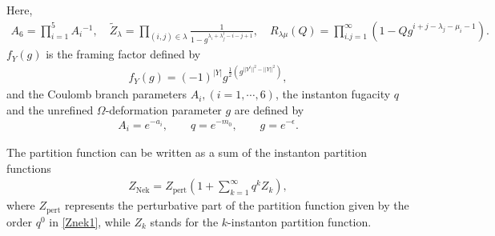 \documentclass[11pt,a4paper]{article}
\begin{document}
Here, 
\begin{align}
A_6 
= \prod_{i=1}^5 A_i{}^{-1}, 
\quad
\tilde{Z}_{\lambda} 
= \prod_{(i,j) \in \lambda} \frac{1}{1 - g^{\lambda_i + \lambda^t_j - i - j +1} } , 
\quad
R_{\lambda \mu } (Q)= \prod_{i.j=1}^{\infty} (1 - Q g^{i+j-\lambda_j - \mu_i -1}).
\end{align}
$f_{Y}(g)$ is the framing factor defined by
\begin{align}
f_Y(g) = (-1)^{|Y|}g^{\frac{1}{2}(g^{||Y^t||^2 - ||Y||^2})},
\end{align}
and the Coulomb branch parameters $A_i, (i=1, \cdots, 6)$, the instanton fugacity $q$ and the unrefined $\Omega$-deformation parameter $g$ are defined by 
\begin{align}
A_i = e^{-a_i}, \qquad q = e^{-m_0}, \qquad g=e^{-\epsilon}.
\end{align}

The partition function can be written as a sum of the instanton partition functions 
\begin{align}
Z_{\text{Nek}} = Z_{\text{pert}}\left(1 + \sum_{k=1}^{\infty}q^kZ_k\right) ,
\end{align}
where $Z_{\text{pert}}$ represents the perturbative part of the partition function given by the order $q^0$ in \eqref{Znek1}, while $Z_k$ stands for the $k$-instanton partition function.
\end{document}
